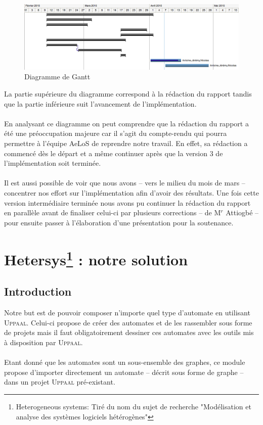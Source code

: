 \documentclass[12pt,a4paper]{report}
\begin{document}
\begin{figure}[!h]
  \centering
  \includegraphics[scale=0.4]{ressources/gantt.png}
  \caption{Diagramme de Gantt}
\end{figure}

La partie supérieure du diagramme correspond à la rédaction du rapport
tandis que la partie inférieure suit l'avancement de l'implémentation.
\\\\
En analysant ce diagramme on peut comprendre que la rédaction du rapport a été
une préoccupation majeure car il s'agit du compte-rendu qui pourra permettre 
à l'équipe AeLoS de reprendre notre travail. En effet, sa rédaction a commencé dès
le départ et a même continuer après que la version 3 de l'implémentation soit terminée.
\\\\
Il est aussi possible de voir que nous avons -- vers le milieu du mois de mars -- concentrer
nos effort sur l'implémentation afin d'avoir des résultats. Une fois cette version intermédiaire
terminée nous avons pu continuer la rédaction du rapport en parallèle avant de 
finaliser celui-ci par plusieurs corrections -- de M$^r$ Attiogbé -- pour ensuite passer à l'élaboration 
d'une présentation pour la soutenance.


\newpage
\chapter[Hetersys : notre solution]{Hetersys\footnote{Heterogeneous systems: Tiré du nom du sujet de recherche "Modélisation et analyse des systèmes logiciels hétérogènes"} : notre solution}
\section{Introduction}

Notre but est de pouvoir composer n'importe quel type d'automate en utilisant 
\textsc{Uppaal}. Celui-ci propose de créer des automates et de les rassembler sous forme de projets 
mais il faut obligatoirement dessiner ces automates avec les outils mis à disposition
par \textsc{Uppaal}.
\\\\
Etant donné que les automates sont un sous-ensemble des graphes, ce module propose 
d'importer directement un automate -- décrit sous forme de graphe -- dans un projet 
\textsc{Uppaal} pré-existant. 
\end{document}
